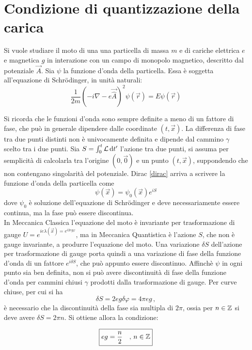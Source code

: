 \section{Condizione di quantizzazione della carica}
Si vuole studiare il moto di una una particella di massa $m$ e di cariche elettrica $e$ e magnetica
$g$ in interazione con un campo di monopolo magnetico, descritto dal potenziale
$\vec A$. Sia $\psi$ la funzione d'onda della particella. Essa è soggetta
all'equazione di Schrödinger, in unità naturali:
\begin{equation}
\frac{1}{2m}\left( -i\nabla - {e} \vec{\hat{A}} \right)^2 \psi(\vec r) = E\psi(\vec r)
\end{equation}

Si ricorda che le funzioni d'onda sono sempre definite a meno di un fattore di fase,
che può in generale dipendere dalle coordinate $(t,\vec x)$. La differenza di fase
tra due punti distinti non è univocamente definita e dipende dal cammino $\gamma$
scelto tra i due punti.
Sia $S = \int_0^t \mathcal{L} \, \mathrm{d} t'$ l'azione tra due punti, si assuma per semplicità
di calcolarla tra l'origine $(0,\vec 0)$ e un punto $(t, \vec x)$, suppondendo
che non contengano singolarità del potenziale. Dirac \ref{dirac}
arriva a scrivere la funzione d'onda della particella come
%
$$
   \psi (\vec x) = \psi_0(\vec x) e^{iS}
$$
%
dove $\psi_0$ è soluzione dell'equazione di Schrödinger e deve necessariamente
essere continua, ma la fase può essere discontinua.\\

In Meccanica Classica l'equazione del moto è invariante per trasformazione di gauge
$U = e^{ie \lambda(\vec x) = e^{i2eg\varphi}}$,
ma in Meccanica Quantistica è l'azione $S$, che non è gauge invariante, a produrre
l'equazione del moto. Una variazione $\delta S$ dell'azione per trasformazione di gauge porta
quindi a una variazione di fase della funzione d'onda di un fattore $e^{i\delta S}$,
che può appunto essere discontinuo. Affinchè $\psi$ in ogni punto sia
ben definita, non si può avere discontinuità di fase della funzione d'onda per
cammini chiusi $\gamma$ prodotti dalla trasformazione di gauge.
Per curve chiuse, per cui si ha
$$
   \delta S = 2eg \delta\varphi = 4\pi e g \, ,
$$
è necessario che la discontinuità della fase sia multipla di $2\pi$, ossia per $n \in \mathbb{Z}$
si deve avere $\delta S = 2\pi n$. Si ottiene allora la condizione:

\begin{equation}\label{eq:diracquantumcharge}
   \boxed{
      eg = \frac{n}{2} \quad, \,  n \in \mathbb{Z}
   }
\end{equation}

